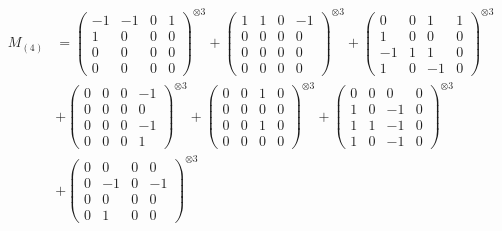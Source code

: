 \documentclass{article}
\newcommand{\Mthree}{%
    M_{(4)}
}
\begin{document}
        \newpage
        
        \footnotesize{
        \begin{align}
        \Mthree
        &= \label{Rs16-Rc11-Solution-30-c1} \begin{pmatrix} -1 & -1 & 0 & 1 \\ 1 & 0 & 0 & 0 \\ 0 & 0 & 0 & 0 \\ 0 & 0 & 0 & 0 \end{pmatrix}^{\otimes 3} 
            + \begin{pmatrix} 1 & 1 & 0 & -1 \\ 0 & 0 & 0 & 0 \\ 0 & 0 & 0 & 0 \\ 0 & 0 & 0 & 0 \end{pmatrix}^{\otimes 3} 
            + \begin{pmatrix} 0 & 0 & 1 & 1 \\ 1 & 0 & 0 & 0 \\ -1 & 1 & 1 & 0 \\ 1 & 0 & -1 & 0 \end{pmatrix}^{\otimes 3} \\
        &+ \label{Rs16-Rc11-Solution-30-c4} \begin{pmatrix} 0 & 0 & 0 & -1 \\ 0 & 0 & 0 & 0 \\ 0 & 0 & 0 & -1 \\ 0 & 0 & 0 & 1 \end{pmatrix}^{\otimes 3} 
            + \begin{pmatrix} 0 & 0 & 1 & 0 \\ 0 & 0 & 0 & 0 \\ 0 & 0 & 1 & 0 \\ 0 & 0 & 0 & 0 \end{pmatrix}^{\otimes 3} 
            + \begin{pmatrix} 0 & 0 & 0 & 0 \\ 1 & 0 & -1 & 0 \\ 1 & 1 & -1 & 0 \\ 1 & 0 & -1 & 0 \end{pmatrix}^{\otimes 3} \\
        &+ \label{Rs16-Rc11-Solution-30-c7} \begin{pmatrix} 0 & 0 & 0 & 0 \\ 0 & -1 & 0 & -1 \\ 0 & 0 & 0 & 0 \\ 0 & 1 & 0 & 0 \end{pmatrix}^{\otimes 3} 

\end{align}}
\end{document}
